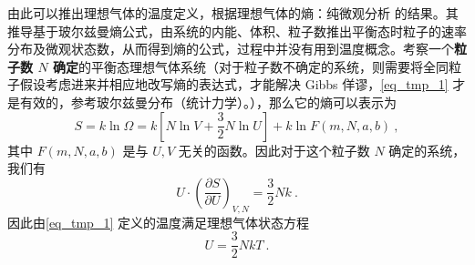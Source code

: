 由此可以推出理想气体的温度定义，根据理想气体的熵：纯微观分析 的结果。其推导基于玻尔兹曼熵公式，由系统的内能、体积、粒子数推出平衡态时粒子的速率分布及微观状态数，从而得到熵的公式，过程中并没有用到温度概念。考察一个\textbf{粒子数 $N$ 确定}的平衡态理想气体系统（对于粒子数不确定的系统，则需要将全同粒子假设考虑进来并相应地改写熵的表达式，才能解决 Gibbs 佯谬，\autoref{eq_tmp_1} 才是有效的，参考玻尔兹曼分布（统计力学）。），那么它的熵可以表示为
\begin{equation}
S=k\ln \Omega =k\left[ N\ln V+\frac{3}{2}N\ln U \right] +k\ln F\left( m,N,a,b \right) ~,
\end{equation}
其中 $F(m,N,a,b)$ 是与 $U,V$ 无关的函数。因此对于这个粒子数 $N$ 确定的系统，我们有
\begin{equation}
U\cdot \left(\frac{\partial S}{\partial U}\right)_{V,N}=\frac{3}{2}Nk~.
\end{equation}
因此由\autoref{eq_tmp_1} 定义的温度满足理想气体状态方程
\begin{equation}
U=\frac{3}{2}NkT~.
\end{equation}
